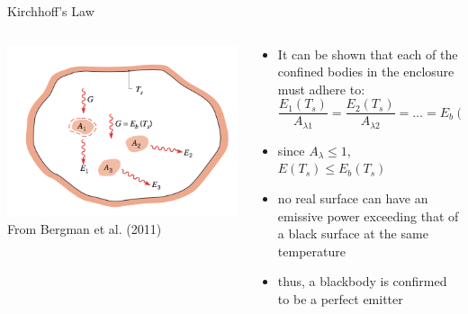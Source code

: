 \begin{frame}{Kirchhoff's Law}
\begin{columns}[T]
    \begin{column}{.4\textwidth}
    \begin{minipage}[c][0.8\textheight][c]{\linewidth}
    \includegraphics[width=1\textwidth]{fig14.png}\\
    \centering \small From Bergman et al. (2011)
    \end{minipage}
    \end{column}
    \begin{column}{.6\textwidth}
    \begin{minipage}[c][0.8\textheight][c]{\linewidth}
   \begin{itemize}
   	\item It can be shown that each of the confined bodies in the enclosure must adhere to:
   	$$\frac{E_1(T_s)}{A_{\lambda1}} = \frac{E_2(T_s)}{A_{\lambda2}} = \ldots = E_b(T_s)$$
   	\item since $A_\lambda \le 1$, $E(T_s) \le E_b(T_s)$
   	\item no real surface can have an emissive power exceeding that of a black surface at the same temperature
   	\item thus, a blackbody is confirmed to be a perfect emitter
   \end{itemize}
      \end{minipage}
    \end{column}
  \end{columns} 
\end{frame}


